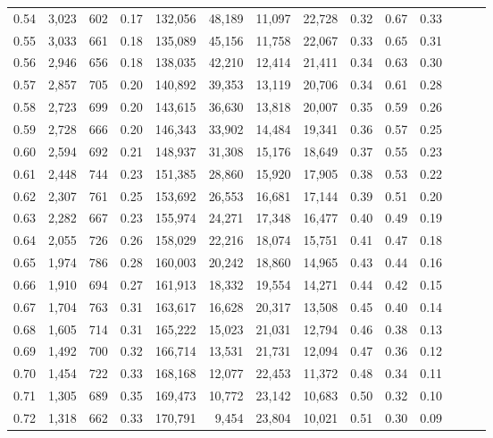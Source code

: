 \begin{tabular}{rrrrrrrrrrrrrr}
0.54 &  3,023 &  602 &  0.17 &  132,056 &   48,189 &  11,097 &  22,728 &  0.32 &  0.67 &      0.33 \\
0.55 &  3,033 &  661 &  0.18 &  135,089 &   45,156 &  11,758 &  22,067 &  0.33 &  0.65 &      0.31 \\
0.56 &  2,946 &  656 &  0.18 &  138,035 &   42,210 &  12,414 &  21,411 &  0.34 &  0.63 &      0.30 \\
0.57 &  2,857 &  705 &  0.20 &  140,892 &   39,353 &  13,119 &  20,706 &  0.34 &  0.61 &      0.28 \\
0.58 &  2,723 &  699 &  0.20 &  143,615 &   36,630 &  13,818 &  20,007 &  0.35 &  0.59 &      0.26 \\
0.59 &  2,728 &  666 &  0.20 &  146,343 &   33,902 &  14,484 &  19,341 &  0.36 &  0.57 &      0.25 \\
0.60 &  2,594 &  692 &  0.21 &  148,937 &   31,308 &  15,176 &  18,649 &  0.37 &  0.55 &      0.23 \\
0.61 &  2,448 &  744 &  0.23 &  151,385 &   28,860 &  15,920 &  17,905 &  0.38 &  0.53 &      0.22 \\
0.62 &  2,307 &  761 &  0.25 &  153,692 &   26,553 &  16,681 &  17,144 &  0.39 &  0.51 &      0.20 \\
0.63 &  2,282 &  667 &  0.23 &  155,974 &   24,271 &  17,348 &  16,477 &  0.40 &  0.49 &      0.19 \\
0.64 &  2,055 &  726 &  0.26 &  158,029 &   22,216 &  18,074 &  15,751 &  0.41 &  0.47 &      0.18 \\
0.65 &  1,974 &  786 &  0.28 &  160,003 &   20,242 &  18,860 &  14,965 &  0.43 &  0.44 &      0.16 \\
0.66 &  1,910 &  694 &  0.27 &  161,913 &   18,332 &  19,554 &  14,271 &  0.44 &  0.42 &      0.15 \\
0.67 &  1,704 &  763 &  0.31 &  163,617 &   16,628 &  20,317 &  13,508 &  0.45 &  0.40 &      0.14 \\
0.68 &  1,605 &  714 &  0.31 &  165,222 &   15,023 &  21,031 &  12,794 &  0.46 &  0.38 &      0.13 \\
0.69 &  1,492 &  700 &  0.32 &  166,714 &   13,531 &  21,731 &  12,094 &  0.47 &  0.36 &      0.12 \\
0.70 &  1,454 &  722 &  0.33 &  168,168 &   12,077 &  22,453 &  11,372 &  0.48 &  0.34 &      0.11 \\
0.71 &  1,305 &  689 &  0.35 &  169,473 &   10,772 &  23,142 &  10,683 &  0.50 &  0.32 &      0.10 \\
0.72 &  1,318 &  662 &  0.33 &  170,791 &    9,454 &  23,804 &  10,021 &  0.51 &  0.30 &      0.09 \\

\end{tabular}
